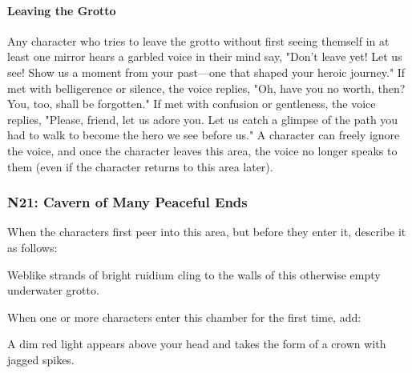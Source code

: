 \documentclass[10pt,a4,twoside,twocolumn,openany,nodeprecatedcode]{dndbook}
\begin{document}
\paragraph{Leaving the Grotto}
Any character who tries to leave the grotto without first seeing themself in at least one mirror hears a garbled voice in their mind say, "Don't leave yet! Let us see! Show us a moment from your past—one that shaped your heroic journey." If met with belligerence or silence, the voice replies, "Oh, have you no worth, then? You, too, shall be forgotten." If met with confusion or gentleness, the voice replies, "Please, friend, let us adore you. Let us catch a glimpse of the path you had to walk to become the hero we see before us." A character can freely ignore the voice, and once the character leaves this area, the voice no longer speaks to them (even if the character returns to this area later).
\subsubsection{N21: Cavern of Many Peaceful Ends}
When the characters first peer into this area, but before they enter it, describe it as follows:
\begin{DndReadAloud}{}
Weblike strands of bright ruidium cling to the walls of this otherwise empty underwater grotto.
\end{DndReadAloud}

When one or more characters enter this chamber for the first time, add:
\begin{DndReadAloud}{}
A dim red light appears above your head and takes the form of a crown with jagged spikes.
\end{DndReadAloud}
\end{document}
